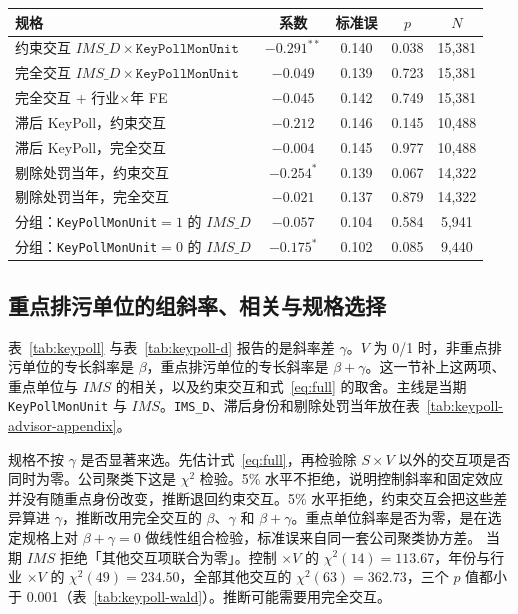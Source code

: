 \documentclass[11pt]{article}
\begin{document}
\begin{center}
\begin{threeparttable}
\caption{重点排污单位：\(IMS\_D\) 交互与分组}
\label{tab:keypoll-d}
\begin{tabular}{lcccc}
\toprule
规格 & 系数 & 标准误 & \(p\) & \(N\) \\
\midrule
约束交互 \(IMS\_D\times\texttt{KeyPollMonUnit}\) & \(-0.291^{**}\) & 0.140 & 0.038 & 15,381 \\
完全交互 \(IMS\_D\times\texttt{KeyPollMonUnit}\) & \(-0.049\) & 0.139 & 0.723 & 15,381 \\
完全交互 + 行业\(\times\)年 FE & \(-0.045\) & 0.142 & 0.749 & 15,381 \\
滞后 KeyPoll，约束交互 & \(-0.212\) & 0.146 & 0.145 & 10,488 \\
滞后 KeyPoll，完全交互 & \(-0.004\) & 0.145 & 0.977 & 10,488 \\
剔除处罚当年，约束交互 & \(-0.254^{*}\) & 0.139 & 0.067 & 14,322 \\
剔除处罚当年，完全交互 & \(-0.021\) & 0.137 & 0.879 & 14,322 \\
\midrule
分组：\texttt{KeyPollMonUnit}\(=1\) 的 \(IMS\_D\) & \(-0.057\) & 0.104 & 0.584 & 5,941 \\
分组：\texttt{KeyPollMonUnit}\(=0\) 的 \(IMS\_D\) & \(-0.175^{*}\) & 0.102 & 0.085 & 9,440 \\
\bottomrule
\end{tabular}
\end{threeparttable}
\end{center}

\subsection{重点排污单位的组斜率、相关与规格选择}
\label{sec:keypoll-advisor}

表~\ref{tab:keypoll} 与表~\ref{tab:keypoll-d} 报告的是斜率差 \(\gamma\)。\(V\) 为 0/1 时，非重点排污单位的专长斜率是 \(\beta\)，重点排污单位的专长斜率是 \(\beta+\gamma\)。这一节补上这两项、重点单位与 \(IMS\) 的相关，以及约束交互和式~\eqref{eq:full} 的取舍。主线是当期 \texttt{KeyPollMonUnit} 与 \(IMS\)。\texttt{IMS\_D}、滞后身份和剔除处罚当年放在表~\ref{tab:keypoll-advisor-appendix}。

规格不按 \(\gamma\) 是否显著来选。先估计式~\eqref{eq:full}，再检验除 \(S\times V\) 以外的交互项是否同时为零。公司聚类下这是 \(\chi^2\) 检验。5\% 水平不拒绝，说明控制斜率和固定效应并没有随重点身份改变，推断退回约束交互。5\% 水平拒绝，约束交互会把这些差异算进 \(\gamma\)，推断改用完全交互的 \(\beta\)、\(\gamma\) 和 \(\beta+\gamma\)。重点单位斜率是否为零，是在选定规格上对 \(\beta+\gamma=0\) 做线性组合检验，标准误来自同一套公司聚类协方差。
当期 \(IMS\) 拒绝「其他交互项联合为零」。控制 \(\times V\) 的 \(\chi^2(14)=113.67\)，年份与行业 \(\times V\) 的 \(\chi^2(49)=234.50\)，全部其他交互的 \(\chi^2(63)=362.73\)，三个 \(p\) 值都小于 0.001（表~\ref{tab:keypoll-wald}）。推断可能需要用完全交互。
\end{document}
